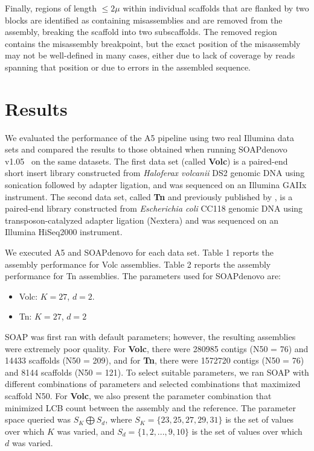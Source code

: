 \documentclass{bioinfo}
\begin{document}
Finally, regions of length $\le 2\mu$ within individual scaffolds that are flanked by two blocks are identified as containing
misassemblies and are removed from the assembly, breaking the scaffold into two subscaffolds. The removed region contains the 
misassembly breakpoint, but the exact position of the misassembly may not be well-defined in many cases, either due to lack of
coverage by reads spanning that position or due to errors in the assembled sequence.



\section{Results}

We evaluated the performance of the A5 pipeline using two real Illumina data sets and compared the results to
those obtained when running SOAPdenovo v1.05~\citep{Li2010} on the same datasets. The first data set (called \textbf{Volc}) is a paired-end short insert library constructed from \emph{Haloferax volcanii} DS2 genomic DNA 
using sonication followed by adapter ligation, and was sequenced on an Illumina GAIIx instrument. 
The second data set, called \textbf{Tn} and previously published by \citet{Adey2010}, is a paired-end library constructed from \emph{Escherichia coli} CC118 genomic DNA
using transposon-catalyzed adapter ligation (Nextera) and was sequenced on an Illumina HiSeq2000 instrument. 

We executed A5 and SOAPdenovo for each data set. Table 1 reports the assembly performance for Volc assemblies.
Table 2 reports the assembly performance for Tn assemblies. The parameters used for SOAPdenovo are:
\begin{itemize}
\item Volc: $K = 27$, $d = 2$.
\item Tn: $K = 27$, $d = 2$
\end{itemize}
SOAP was first ran with default parameters; however, the resulting assemblies were extremely poor quality. For \textbf{Volc}, there were
280985 contigs (N50 = 76) and 14433 scaffolds (N50 = 209), and for \textbf{Tn}, there were 1572720 contigs (N50 = 76) and 8144 scaffolds (N50 = 121). 
To select suitable parameters, we ran SOAP with different combinations of parameters and selected combinations that maximized scaffold N50. For \textbf{Volc},
we also present the parameter combination that minimized LCB count between the assembly and the reference. The parameter space queried was $S_K \bigoplus S_d$,
where $S_K = \{23,25,27,29,31\}$ is the set of values over which $K$ was varied, and $S_d = \{1,2,...,9,10\}$ is the set of values over which $d$
was varied.
\end{document}
